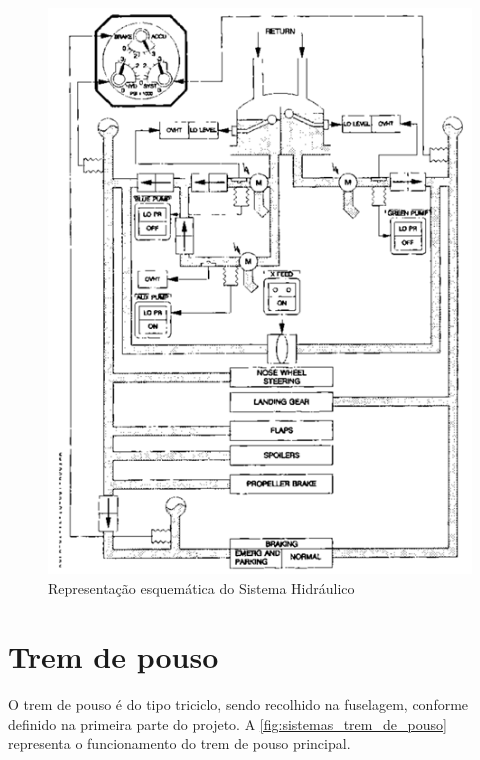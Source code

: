 \begin{figure}
\includegraphics[width=\textwidth]{images/parte3/sistemas_hidraulico.png}
\caption{Representação esquemática do Sistema Hidráulico}
\label{fig:sistemas_hidraulico}
\end{figure}


\section{Trem de pouso}

O trem de pouso é do tipo triciclo, sendo recolhido na fuselagem, conforme definido na primeira parte do projeto.
A \autoref{fig:sistemas_trem_de_pouso} representa o funcionamento do trem de pouso principal.

